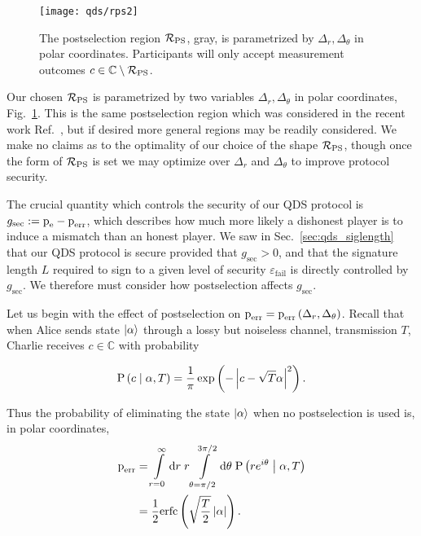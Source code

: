 \begin{figure}[htp]
\captionsetup{width=0.8\linewidth}
\centering
\texttt{[image: qds/rps2]}
\caption{\label{fig:rps} The postselection region $\mathcal{R}_{\text{PS}}$, gray, is parametrized by $\Delta_r, \Delta_\theta$ in polar coordinates. Participants will only accept measurement outcomes $c \in \mathbb{C} \setminus \mathcal{R}_{\text{PS}}$. }
\end{figure}

Our chosen $\mathcal{R}_{\text{PS}}$ is parametrized by two variables $\Delta_r, \Delta_\theta$ in polar coordinates, Fig.~\ref{fig:rps}. This is the same postselection region which was considered in the recent work Ref.~\cite{Lin2019}, but if desired more general regions may be readily considered. We make no claims as to the optimality of our choice of the shape $\mathcal{R}_{\text{PS}}$, though once the form of $\mathcal{R}_{\text{PS}}$ is set we may optimize over $\Delta_r$ and $\Delta_\theta$ to improve protocol security.

The crucial quantity which controls the security of our QDS protocol is $g_{\text{sec}} := \text{p}_{\text{e}} - \text{p}_{\text{err}}$, which describes how much more likely a dishonest player is to induce a mismatch than an honest player. We saw in Sec.~\ref{sec:qds_siglength} that our QDS protocol is secure provided that $g_{\text{sec}} > 0$, and that the signature length $L$ required to sign to a given level of security $\varepsilon_{\text{fail}}$ is directly controlled by $g_{\text{sec}}$. We therefore must consider how postselection affects $g_{\text{sec}}$. 

Let us begin with the effect of postselection on $\text{p}_{\text{err}} = \text{p}_{\text{err}}\left(\Delta_r, \Delta_\theta\right)$. %
Recall that when Alice sends state $\ket{\alpha}$ through a lossy but noiseless channel, transmission $T$, Charlie receives $c \in \mathbb{C}$ with probability

\begin{equation}
\text{P}\left(c \; \middle| \; \alpha, T\right) = \frac{1}{\pi} \exp\left( - \left| c - \sqrt{T}\alpha\right|^2\right).
\end{equation}

\noindent Thus the probability of eliminating the state $\ket{\alpha}$ when no postselection is used is, in polar coordinates,
\begin{align}\label{eqn:perrps_deriv_nops}
\perr &= \int\limits_{r=0}^\infty \mathrm{d}r \; r \int\limits_{\theta = \pi/2}^{3 \pi/2} \mathrm{d}\theta \; \text{P}\left(r e^{i \theta} \given \alpha, T\right) \notag \\
%
&= \frac{1}{2}\erfc\left(\sqrt{\frac{T}{2}}\left|\alpha\right|\right).
\end{align}

